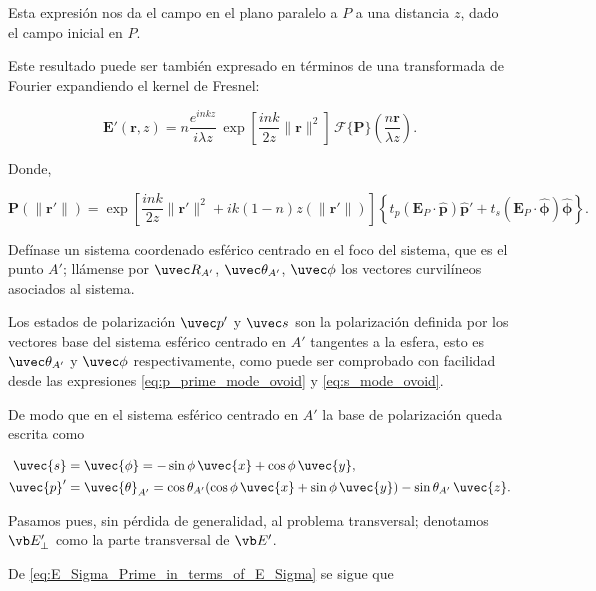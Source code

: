 Esta expresión nos da el campo en el plano paralelo a $P$ a una distancia $z$, dado el campo inicial en $P$.

Este resultado puede ser también expresado en términos de una transformada de Fourier expandiendo el kernel de Fresnel:

\begin{equation}
\mathbf{E}'(\mathbf r,z)
=
n\frac{e^{inkz}}{i\lambda z}\,
\exp\!\left[
\frac{ink}{2z}\|\mathbf r\|^2
\right]
\,
\mathscr F\{\mathbf P\}
\left(
\frac{n\mathbf r}{\lambda z}
\right).
\label{E_in_observation_plane_as_FT_3D}
\end{equation}

Donde,

\begin{equation}
\mathbf P(\|\mathbf r'\|)
=
\exp\!\left[
\frac{ink}{2z}\|\mathbf r'\|^2
+
ik(1-n)z(\|\mathbf r'\|)
\right]
\left\{
t_p (\mathbf{E}_P\cdot \hat{\boldsymbol p}) \hat{\boldsymbol p}'
+
t_s (\mathbf{E}_P\cdot \hat{\boldsymbol\phi}) \hat{\boldsymbol\phi}
\right\}.
\label{eq:P_definition}
\end{equation}

Defínase un sistema coordenado esférico centrado en el foco del sistema, que es el punto $A'$; llámense por $\uvec R_{A'}$, $\uvec \theta_{A'}$, $\uvec \phi$ los vectores curvilíneos asociados al sistema.

Los estados de polarización $\uvec p'$ y $\uvec s$ son la polarización definida por los vectores base del sistema esférico centrado en $A'$ tangentes a la esfera, esto es $\uvec \theta_{A'}$ y $\uvec \phi$ respectivamente, como puede ser comprobado con facilidad desde las expresiones \eqref{eq:p_prime_mode_ovoid} y \eqref{eq:s_mode_ovoid}.

De modo que en el sistema esférico centrado en $A'$ la base de polarización queda escrita como

\begin{align}
\uvec{s}
&=
\uvec{\phi}
=
-\sin\phi\,\uvec{x}
+
\cos\phi\,\uvec{y},
\\
\uvec{p}'
&=
\uvec{\theta}_{A'}
=
\cos\theta_{A'}
(\cos\phi\,\uvec{x}+\sin\phi\,\uvec{y})
-
\sin\theta_{A'}\,\uvec{z}.
\label{s_p_in_A_prime_system}
\end{align}

Pasamos pues, sin pérdida de generalidad, al problema transversal; denotamos $\vb E'_\perp$ como la parte transversal de $\vb E'$.

De \eqref{eq:E_Sigma_Prime_in_terms_of_E_Sigma} se sigue que

